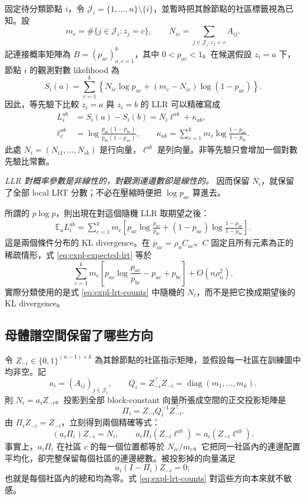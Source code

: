 \documentclass[11pt,a4paper]{article}
\theoremstyle{zhplain}
\numberwithin{equation}{section}
\begin{document}
固定待分類節點 $i$，令 $\mathcal J_i=\{1,\ldots,n\}\setminus\{i\}$，並暫時把其餘節點的社區標籤視為已知。設
\[
 m_c=\#\{j\in\mathcal J_i:z_j=c\},
 \qquad
 N_{ic}=\sum_{j\in\mathcal J_i:z_j=c}A_{ij}.
\]
記連接概率矩陣為 $B=(p_{ac})_{a,c=1}^k$，其中 $0<p_{ac}<1$。在候選假設 $z_i=a$ 下，節點 $i$ 的觀測對數 likelihood 為
\[
 S_i(a)=\sum_{c=1}^k
 \left\{N_{ic}\log p_{ac}+(m_c-N_{ic})\log(1-p_{ac})\right\}.
\]
因此，等先驗下比較 $z_i=a$ 與 $z_i=b$ 的 LLR 可以精確寫成
\begin{align}
 L_i^{ab}
 &=S_i(a)-S_i(b)
   =N_i\ell^{ab}+\kappa_{ab},
 \label{eq:expl-lrt-counts}\\
 \ell_c^{ab}
 &=\log\frac{p_{ac}(1-p_{bc})}{p_{bc}(1-p_{ac})},
 \qquad
 \kappa_{ab}=\sum_{c=1}^k m_c
 \log\frac{1-p_{ac}}{1-p_{bc}}.
 \nonumber
\end{align}
此處 $N_i=(N_{i1},\ldots,N_{ik})$ 是行向量，$\ell^{ab}$ 是列向量。非等先驗只會增加一個對數先驗比常數。

\emph{LLR 對概率參數是非線性的，對觀測連邊數卻是線性的。} 因而保留 $N_i$，就保留了全部 local LRT 分數；不必在壓縮時便把 $\log p_{ac}$ 算進去。

所謂的 $p\log p$，則出現在對這個隨機 LLR 取期望之後：
\begin{align}
 \mathbb E_a L_i^{ab}
 =\sum_{c=1}^k m_c\left[
 p_{ac}\log\frac{p_{ac}}{p_{bc}}
 +(1-p_{ac})\log\frac{1-p_{ac}}{1-p_{bc}}
 \right].
 \label{eq:expl-expected-lrt}
\end{align}
這是兩個條件分布的 KL divergence。在 $p_{ac}=\rho_n C_{ac}$、$C$ 固定且所有元素為正的稀疏情形，式 \eqref{eq:expl-expected-lrt} 等於
\[
 \sum_{c=1}^k m_c
 \left[p_{ac}\log\frac{p_{ac}}{p_{bc}}-p_{ac}+p_{bc}\right]
 +O(n\rho_n^2).
\]
實際分類使用的是式 \eqref{eq:expl-lrt-counts} 中隨機的 $N_i$，而不是把它換成期望後的 KL divergence。

\subsection{母體譜空間保留了哪些方向}

令 $Z_{-i}\in\{0,1\}^{(n-1)\times k}$ 為其餘節點的社區指示矩陣，並假設每一社區在訓練圖中均非空。記
\[
 a_i=(A_{ij})_{j\in\mathcal J_i},
 \qquad
 Q_i=Z_{-i}^{\top}Z_{-i}=\operatorname{diag}(m_1,\ldots,m_k).
\]
則 $N_i=a_iZ_{-i}$。投影到全部 block-constant 向量所張成空間的正交投影矩陣是
\[
 \Pi_i=Z_{-i}Q_i^{-1}Z_{-i}^{\top}.
\]
由 $\Pi_iZ_{-i}=Z_{-i}$，立刻得到兩個精確等式：
\begin{equation}
 \boxed{(a_i\Pi_i)Z_{-i}=N_i,\qquad
 a_i\Pi_i(Z_{-i}\ell^{ab})=a_i(Z_{-i}\ell^{ab}).}
 \label{eq:expl-projector-preserves-counts}
\end{equation}
事實上，$a_i\Pi_i$ 在社區 $c$ 的每一個位置都等於 $N_{ic}/m_c$。它把同一社區內的連邊配置平均化，卻完整保留每個社區的連邊總數。被投影掉的向量滿足
\[
 a_i(I-\Pi_i)Z_{-i}=0;
\]
也就是每個社區內的總和均為零。式 \eqref{eq:expl-lrt-counts} 對這些方向本來就不敏感。
\end{document}
